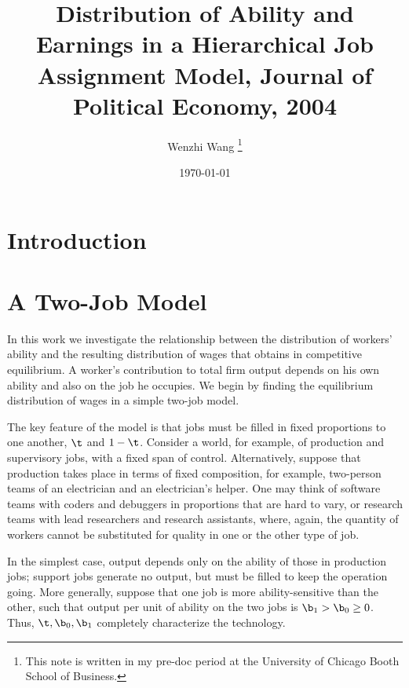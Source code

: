 \documentclass[12pt]{article}
\theoremstyle{definition}
\begin{document}
 


\title{\bf Distribution of Ability and Earnings in a Hierarchical Job Assignment Model, Journal of Political Economy, 2004} 
\author{Wenzhi Wang \thanks{This note is written in my pre-doc period at the University of Chicago Booth School of Business.} } 
\date{\today} 
\maketitle 

\citet{costrellDistributionAbilityEarnings2004}

\section{Introduction}

\section{A Two-Job Model}

In this work we investigate the relationship between the distribution of workers' ability and the resulting distribution of wages that obtains in competitive equilibrium. A worker's contribution to total firm output depends on his own ability and also on the job he occupies. We begin by finding the equilibrium distribution of wages in a simple two-job model. 

The key feature of the model is that jobs must be filled in fixed proportions to one another, $\t$ and $1-\t$. Consider a world, for example, of production and supervisory jobs, with a fixed span of control. Alternatively, suppose that production takes place in terms of fixed composition, for example, two-person teams of an electrician and an electrician's helper. One may think of software teams with coders and debuggers in proportions that are hard to vary, or research teams with lead researchers and research assistants, where, again, the quantity of workers cannot be substituted for quality in one or the other type of job.

In the simplest case, output depends only on the ability of those in production jobs; support jobs generate no output, but must be filled to keep the operation going. More generally, suppose that one job is more ability-sensitive than the other, such that output per unit of ability on the two jobs is $\b_1 > \b_0 \geq 0$. Thus, $\t, \b_0, \b_1$ completely characterize the technology. 
\end{document}
